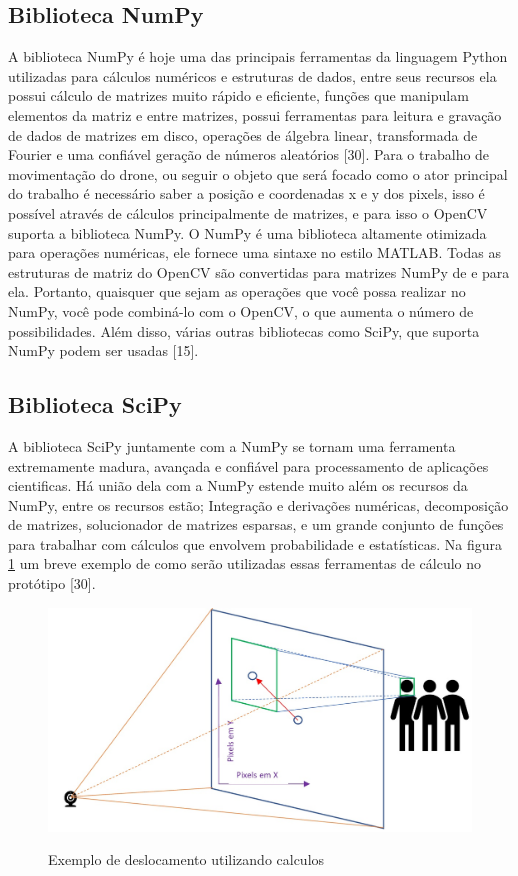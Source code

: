 \subsection{Biblioteca NumPy}
A biblioteca NumPy é hoje uma das principais ferramentas da linguagem Python utilizadas para cálculos numéricos e estruturas de dados, entre seus recursos ela possui cálculo de matrizes muito rápido e eficiente, funções que manipulam elementos da matriz e entre matrizes, possui ferramentas para leitura e gravação de dados de matrizes em disco, operações de álgebra linear, transformada de Fourier e uma confiável geração de números aleatórios [30]. 
Para o trabalho de movimentação do drone, ou seguir o objeto que será focado como o ator principal do trabalho é necessário saber a posição e coordenadas x e y dos pixels, isso é possível através de cálculos principalmente de matrizes, e para isso o OpenCV suporta a biblioteca NumPy.
 O NumPy é uma biblioteca altamente otimizada para operações numéricas, ele fornece uma sintaxe no estilo MATLAB. Todas as estruturas de matriz do OpenCV são convertidas para matrizes NumPy de e para ela. Portanto, quaisquer que sejam as operações que você possa realizar no NumPy, você pode combiná-lo com o OpenCV, o que aumenta o número de possibilidades. Além disso, várias outras bibliotecas como SciPy, que suporta NumPy podem ser usadas [15]. 

\subsection{Biblioteca SciPy}
A biblioteca SciPy juntamente com a NumPy se tornam uma ferramenta extremamente madura, avançada e confiável para processamento de aplicações cientificas. Há união dela com a NumPy estende muito além os recursos da NumPy, entre os recursos estão; Integração e derivações numéricas, decomposição de matrizes, solucionador de matrizes esparsas, e um grande conjunto de funções para trabalhar com cálculos que envolvem probabilidade e estatísticas. 
Na figura \ref{fig:desl} um breve exemplo de como serão utilizadas essas ferramentas de cálculo no protótipo [30].

\begin{figure}[htpb]
  \centering
  \caption{Exemplo de deslocamento utilizando calculos }
  \includegraphics[scale=.5]{figs/rosto.jpg}
  \label{fig:desl}
\end{figure}

